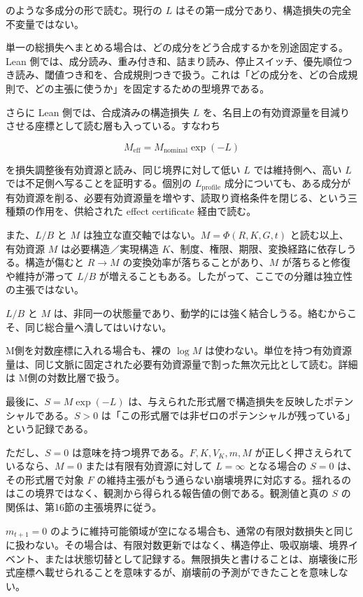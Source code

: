 \documentclass[12pt,a4paper]{article}
\begin{document}
のような多成分の形で読む。現行の \(L\) はその第一成分であり、構造損失の完全不変量ではない。

単一の総損失へまとめる場合は、どの成分をどう合成するかを別途固定する。Lean 側では、成分読み、重み付き和、詰まり読み、停止スイッチ、優先順位つき読み、閾値つき和を、合成規則つきで扱う。これは「どの成分を、どの合成規則で、どの主張に使うか」を固定するための型境界である。

さらに Lean 側では、合成済みの構造損失 \(L\) を、名目上の有効資源量を目減りさせる座標として読む層も入っている。すなわち

\[
M_{\mathrm{eff}} = M_{\mathrm{nominal}}\exp(-L)
\]

を損失調整後有効資源と読み、同じ境界に対して低い \(L\) では維持側へ、高い \(L\) では不足側へ写ることを証明する。個別の \(L_{\mathrm{profile}}\) 成分についても、ある成分が有効資源を削る、必要有効資源量を増やす、読取り資格条件を閉じる、という三種類の作用を、供給された effect certificate 経由で読む。

また、\(L/B\) と \(M\) は独立な直交軸ではない。\(M=\Phi(R,K,G,t)\) と読む以上、有効資源 \(M\) は必要構造／実現構造 \(K\)、制度、権限、期限、変換経路に依存しうる。構造が傷むと \(R\to M\) の変換効率が落ちることがあり、\(M\) が落ちると修復や維持が滞って \(L/B\) が増えることもある。したがって、ここでの分離は独立性の主張ではない。

\(L/B\) と \(M\) は、非同一の状態量であり、動学的には強く結合しうる。絡むからこそ、同じ総合量へ潰してはいけない。

M側を対数座標に入れる場合も、裸の \(\log M\) は使わない。単位を持つ有効資源量は、同じ文脈に固定された必要有効資源量で割った無次元比として読む。詳細は M側の対数比層で扱う。

最後に、\(S=M\exp(-L)\) は、与えられた形式層で構造損失を反映したポテンシャルである。\(S>0\) は「この形式層では非ゼロのポテンシャルが残っている」という記録である。

ただし、\(S=0\) は意味を持つ境界である。\(F,K,V_K,m,M\) が正しく押さえられているなら、\(M=0\) または有限有効資源に対して \(L=\infty\) となる場合の \(S=0\) は、その形式層で対象 \(F\) の維持主張がもう通らない崩壊境界に対応する。揺れるのはこの境界ではなく、観測から得られる報告値の側である。観測値と真の \(S\) の関係は、第16節の主張境界に従う。

\(m_{t+1}=0\) のように維持可能領域が空になる場合も、通常の有限対数損失と同じに扱わない。その場合は、有限対数更新ではなく、構造停止、吸収崩壊、境界イベント、または状態切替として記録する。無限損失と書けることは、崩壊後に形式座標へ載せられることを意味するが、崩壊前の予測ができたことを意味しない。
\end{document}
